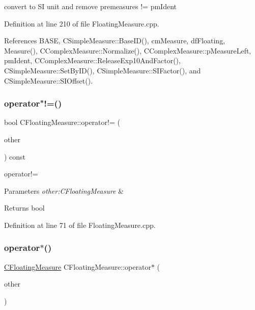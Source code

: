 convert to SI unit and remove premeasures != pm\+Ident 



Definition at line 210 of file Floating\+Measure.\+cpp.



References B\+A\+SE, C\+Simple\+Measure\+::\+Base\+I\+D(), cm\+Measure, df\+Floating, Measure(), C\+Complex\+Measure\+::\+Normalize(), C\+Complex\+Measure\+::p\+Measure\+Left, pm\+Ident, C\+Complex\+Measure\+::\+Release\+Exp10\+And\+Factor(), C\+Simple\+Measure\+::\+Set\+By\+I\+D(), C\+Simple\+Measure\+::\+S\+I\+Factor(), and C\+Simple\+Measure\+::\+S\+I\+Offset().

\mbox{\label{classCFloatingMeasure_afbedc9a56acac7c6738357ce2347aad3}} 
\subsubsection{\texorpdfstring{operator"!=()}{operator!=()}}
{\footnotesize\ttfamily bool C\+Floating\+Measure\+::operator!= (\begin{DoxyParamCaption}\item[{const \hyperlink{classCFloatingMeasure}{C\+Floating\+Measure} \&}]{other }\end{DoxyParamCaption}) const}



operator!= 


\begin{DoxyParams}{Parameters}
{\em other\+:\+C\+Floating\+Measure} & \\
\hline
\end{DoxyParams}
\begin{DoxyReturn}{Returns}
bool 
\end{DoxyReturn}


Definition at line 71 of file Floating\+Measure.\+cpp.

\mbox{\label{classCFloatingMeasure_a993623835ced24f74075861b2aab736e}} 
\subsubsection{\texorpdfstring{operator$\ast$()}{operator*()}\hspace{0.1cm}{\footnotesize\ttfamily [1/2]}}
{\footnotesize\ttfamily \hyperlink{classCFloatingMeasure}{C\+Floating\+Measure} C\+Floating\+Measure\+::operator$\ast$ (\begin{DoxyParamCaption}\item[{const \hyperlink{classCFloatingMeasure}{C\+Floating\+Measure} \&}]{other }\end{DoxyParamCaption})}



